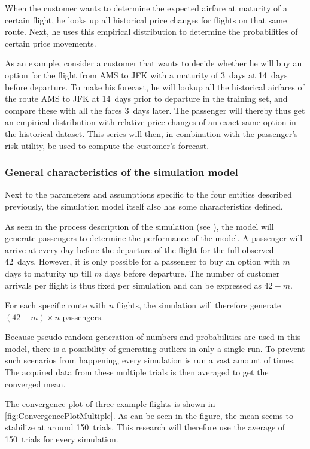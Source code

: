 When the customer wants to determine the expected airfare at maturity of a certain flight, he looks up all historical price changes for flights on that same route. Next, he uses this empirical distribution to determine the probabilities of certain price movements.

As an example, consider a customer that wants to decide whether he will buy an option for the flight from AMS to JFK with a maturity of 3~days at 14~days before departure. To make his forecast, he will lookup all the historical airfares of the route AMS to JFK at 14~days prior to departure in the training set, and compare these with all the fares 3~days later. The passenger will thereby thus get an empirical distribution with relative price changes of an exact same option in the historical dataset. This series will then, in combination with the passenger's risk utility, be used to compute the customer's forecast.


\subsubsection{General characteristics of the simulation model}
Next to the parameters and assumptions specific to the four entities described previously, the simulation model itself also has some characteristics defined.

As seen in the process description of the simulation (see ), the model will generate passengers to determine the performance of the model. A passenger will arrive at every day before the departure of the flight for the full observed 42~days. However, it is only possible for a passenger to buy an option with $m$ days to maturity up till $m$ days before departure. The number of customer arrivals per flight is thus fixed per simulation and can be expressed as $42 - m$.

For each specific route with $n$ flights, the simulation will therefore generate $(42 - m) \times n$ passengers.

Because pseudo random generation of numbers and probabilities are used in this model, there is a possibility of generating outliers in only a single run. To prevent such scenarios from happening, every simulation is run a vast amount of times. The acquired data from these multiple trials is then averaged to get the converged mean.

The convergence plot of three example flights is shown in \autoref{fig:ConvergencePlotMultiple}. As can be seen in the figure, the mean seems to stabilize at around 150~trials. This research will therefore use the average of 150~trials for every simulation.

